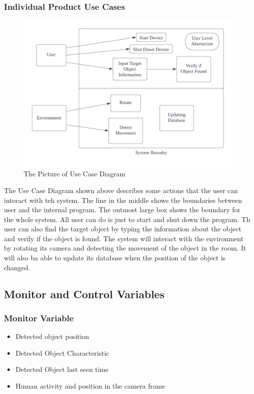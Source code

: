 \documentclass[12pt]{article}
\begin{document}
\subsubsection{Individual Product Use Cases}
\begin{figure}[H]
    \centering
    \includegraphics[scale=0.8]{Use.png}
    \caption{The Picture of Use Case Diagram}
\end{figure}
The Use Case Diagram shown above describes some actions that the user can interact with teh system. The line in the middle shows the boundaries between user and the internal program. The outmost large box shows the boundary for the whole system. All user can do is just to start and shut down the program. Th user can also find the target object by typing the information about the object and verify if the object is found. The system will interact with the environment by rotating its camera and detecting the movement of the object in the room. It will also ba able to update its database when the position of the object is changed. 

\subsection{Monitor and Control Variables}
\subsubsection{Monitor Variable}
\begin{itemize}
    \item Detected object position
    \item Detected Object Characteristic 
    \item Detected Object last seen time
    \item Human activity and position in the camera frame
\end{itemize}
\end{document}
